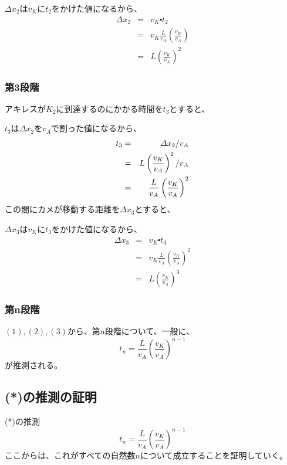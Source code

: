 \documentclass[12pt,a4paper,fleqn]{ltjsarticle}
\begin{document}
$\varDelta x_2$は$v_K$に$t_2$をかけた値になるから、
\begin{eqnarray*}
  \varDelta x_2 &=& v_K \centerdot t_2 \\
                &=& v_K\frac{L}{v_A}\left( \frac{v_K}{v_A} \right) \\
                &=& L\left( \frac{v_K}{v_A} \right)^2
\end{eqnarray*}

\subsubsection{第3段階}
アキレスが$K_2$に到達するのにかかる時間を$t_3$とすると、

$t_3$は$\varDelta x_2$を$v_A$で割った値になるから、
\begin{eqnarray*}
  t_3 &=& \varDelta x_2 / v_A \notag \\
      &=& L\left( \frac{v_K}{v_A} \right)^2 / v_A \notag \\
      &=& \frac{L}{v_A}\left( \frac{v_K}{v_A} \right)^2
\end{eqnarray*}
この間にカメが移動する距離を$\varDelta x_3$とすると、

$\varDelta x_3$は$v_K$に$t_3$をかけた値になるから、
\begin{eqnarray*}
  \varDelta x_3 &=& v_K \centerdot t_3 \\
                &=& v_K\frac{L}{v_A}\left( \frac{v_K}{v_A} \right)^2 \\
                &=& L\left( \frac{v_K}{v_A} \right)^3
\end{eqnarray*}

\subsubsection{第n段階}
$(1),(2),(3)$から、第n段階について、一般に、
\begin{equation}
  t_n = \frac{L}{v_A}\left( \frac{v_K}{v_A} \right)^{n-1} \tag{$*$}
\end{equation}
が推測される。

\newpage

\subsection{(*)の推測の証明}
(*)の推測
\begin{equation}
  t_n = \frac{L}{v_A}\left( \frac{v_K}{v_A} \right)^{n-1} \tag{$*$}
\end{equation}
ここからは、これがすべての自然数$n$について成立することを証明していく。
\end{document}
